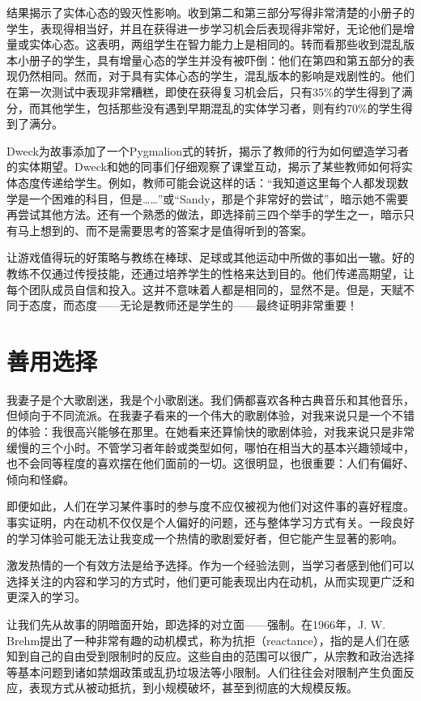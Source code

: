 结果揭示了实体心态的毁灭性影响。收到第二和第三部分写得非常清楚的小册子的学生，表现得相当好，并且在获得进一步学习机会后表现得非常好，无论他们是增量或实体心态。这表明，两组学生在智力能力上是相同的。转而看那些收到混乱版本小册子的学生，具有增量心态的学生并没有被吓倒：他们在第四和第五部分的表现仍然相同。然而，对于具有实体心态的学生，混乱版本的影响是戏剧性的。他们在第一次测试中表现非常糟糕，即使在获得复习机会后，只有35\%的学生得到了满分，而其他学生，包括那些没有遇到早期混乱的实体学习者，则有约70\%的学生得到了满分。

Dweck为故事添加了一个Pygmalion式的转折，揭示了教师的行为如何塑造学习者的实体期望。Dweck和她的同事们仔细观察了课堂互动，揭示了某些教师如何将实体态度传递给学生。例如，教师可能会说这样的话：“我知道这里每个人都发现数学是一个困难的科目，但是……”或“Sandy，那是个非常好的尝试”，暗示她不需要再尝试其他方法。还有一个熟悉的做法，即选择前三四个举手的学生之一，暗示只有马上想到的、而不是需要思考的答案才是值得听到的答案。

让游戏值得玩的好策略与教练在棒球、足球或其他运动中所做的事如出一辙。好的教练不仅通过传授技能，还通过培养学生的性格来达到目的。他们传递高期望，让每个团队成员自信和投入。这并不意味着人都是相同的，显然不是。但是，天赋不同于态度，而态度——无论是教师还是学生的——最终证明非常重要！

\section*{善用选择}

我妻子是个大歌剧迷，我是个小歌剧迷。我们俩都喜欢各种古典音乐和其他音乐，但倾向于不同流派。在我妻子看来的一个伟大的歌剧体验，对我来说只是一个不错的体验：我很高兴能够在那里。在她看来还算愉快的歌剧体验，对我来说只是非常缓慢的三个小时。不管学习者年龄或类型如何，哪怕在相当大的基本兴趣领域中，也不会同等程度的喜欢摆在他们面前的一切。这很明显，也很重要：人们有偏好、倾向和怪癖。

即便如此，人们在学习某件事时的参与度不应仅被视为他们对这件事的喜好程度。事实证明，内在动机不仅仅是个人偏好的问题，还与整体学习方式有关。一段良好的学习体验可能无法让我变成一个热情的歌剧爱好者，但它能产生显著的影响。

激发热情的一个有效方法是给予选择。作为一个经验法则，当学习者感到他们可以选择关注的内容和学习的方式时，他们更可能表现出内在动机，从而实现更广泛和更深入的学习。

让我们先从故事的阴暗面开始，即选择的对立面——强制。在1966年，J. W. Brehm提出了一种非常有趣的动机模式，称为抗拒（reactance），指的是人们在感知到自己的自由受到限制时的反应。这些自由的范围可以很广，从宗教和政治选择等基本问题到诸如禁烟政策或乱扔垃圾法等小限制。人们往往会对限制产生负面反应，表现方式从被动抵抗，到小规模破坏，甚至到彻底的大规模反叛。

